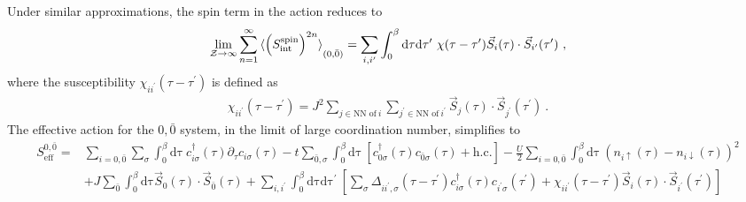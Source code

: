 \documentclass[reprint,hidelinks]{revtex4-2}
\begin{document}
\begin{widetext}
Under similar approximations, the spin term in the action reduces to
\begin{equation}\begin{aligned}
	\lim_{\mathcal{Z}\to \infty}\sum_{n=1}^\infty \braket{\left(S_\text{int}^\text{spin}\right)^{2n}}_{(0,{\bar 0})} = \sum_{i,i^\prime}\int_0^\beta\mathrm{d\tau}\mathrm{d\tau^\prime}~\chi(\tau - \tau^\prime)\vec{S}_{i}(\tau)\cdot\vec{S}_{i^\prime}(\tau^\prime)~,
\end{aligned}\end{equation}
where the susceptibility \(\chi_{ii^\prime}(\tau - \tau^\prime)\) is defined as 
\begin{equation}\begin{aligned}
	\chi_{ii^\prime}(\tau - \tau^\prime) = J^2\sum_{j \in \text{NN of}~i}\sum_{j^\prime \in \text{NN of}~i^\prime}\vec{S}_{j}(\tau)\cdot\vec{S}_{j^\prime}(\tau^\prime)~.
\end{aligned}\end{equation}
The effective action for the \(0,\bar 0\) system, in the limit of large coordination number, simplifies to
\begin{equation}\begin{aligned}
	S^{0,{\bar 0}}_\text{eff} =& \sum_{i=0,{\bar 0}}\sum_\sigma \int_0^\beta\mathrm{d\tau}~c^\dagger_{i\sigma}(\tau)\partial_\tau c_{i\sigma}(\tau)  - t\sum_{{\bar 0},\sigma}\int_0^\beta\mathrm{d\tau}~\left[c^\dagger_{0\sigma}(\tau)c_{{\bar 0}\sigma}(\tau) + \text{h.c.}\right] - \frac{U}{2}\sum_{i=0,{\bar 0}}\int_0^\beta\mathrm{d\tau}~\left(n_{i \uparrow}(\tau) - n_{i \downarrow}(\tau)\right)^2 \\
				   &+ J\sum_{{\bar 0}}\int_0^\beta\mathrm{d\tau} \vec{S}_0(\tau)\cdot\vec{S}_{{\bar 0}}(\tau) + \sum_{i,i^\prime}\int_0^\beta\mathrm{d\tau}\mathrm{d\tau^\prime}~\left[\sum_{\sigma}\Delta_{ii^\prime,\sigma}(\tau - \tau^\prime)c^\dagger_{i\sigma}(\tau)c_{i^\prime\sigma}(\tau^\prime) + \chi_{ii^\prime}(\tau - \tau^\prime)\vec{S}_{i}(\tau)\cdot\vec{S}_{i^\prime}(\tau^\prime)\right]
\end{aligned}\end{equation}


\end{widetext}
\end{document}
